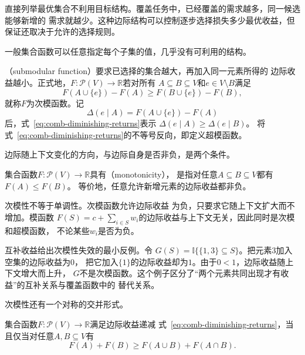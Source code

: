 直接列举最优集合不利用目标结构。覆盖任务中，已经覆盖的需求越多，同一候选能够新增的
需求就越少。这种边际结构可以控制逐步选择损失多少最优收益，但保证还取决于允许的选择规则。

一般集合函数可以任意指定每个子集的值，几乎没有可利用的结构。
\begin{definition}[次模函数与边际收益]
\label{def:comb-submodular-function}
（submodular function）要求已选择的集合越大，再加入同一元素所得的
边际收益越小。正式地，$F:\mathcal{P}(V)\to\mathbb{R}$若对所有
$A\subseteq B\subseteq V$和$e\in V\setminus B$满足
\begin{equation}
  F(A\cup\{e\})-F(A)
  \geq
  F(B\cup\{e\})-F(B),
  \label{eq:comb-diminishing-returns}
\end{equation}
就称$F$为次模函数。记
\[
  \Delta(e\mid A)=F(A\cup\{e\})-F(A)
\]
后，式~\eqref{eq:comb-diminishing-returns}表示
$\Delta(e\mid A)\geq\Delta(e\mid B)$。
将式~\eqref{eq:comb-diminishing-returns}的不等号反向，即定义超模函数。
\end{definition}

边际随上下文变化的方向，与边际自身是否非负，是两个条件。
\begin{definition}[集合函数的单调性]
\label{def:comb-monotone-set-function}
集合函数$F:\mathcal P(V)\to\mathbb R$具有（monotonicity），
是指对任意$A\subseteq B\subseteq V$都有$F(A)\leq F(B)$。
等价地，任意允许新增元素的边际收益都非负。
\end{definition}
次模性不等于单调性。次模函数允许边际收益
为负，只要求它随上下文扩大而不增加。模函数
$F(S)=c+\sum_{i\in S}w_i$的边际收益与上下文无关，因此同时是次模和超模函数，
不论某些$w_i$是否为负。

互补收益给出次模性失效的最小反例。令
$G(S)=\mathbb{I}\{\{1,3\}\subseteq S\}$。把元素$3$加入空集的边际收益为$0$，
把它加入$\{1\}$的边际收益却为$1$。由于$0<1$，边际收益随上下文增大而上升，
$G$不是次模函数。这个例子区分了“两个元素共同出现才有收益”的互补关系与覆盖函数中的
替代关系。

次模性还有一个对称的交并形式。

\begin{theorem}[次模性的两个等价定义]
\label{thm:comb-submodular-equivalence}
集合函数$F:\mathcal{P}(V)\to\mathbb{R}$满足边际收益递减
式~\eqref{eq:comb-diminishing-returns}，当且仅当对任意$A,B\subseteq V$有
\begin{equation}
  F(A)+F(B)\geq F(A\cup B)+F(A\cap B).
  \label{eq:comb-submodular-lattice}
\end{equation}
\end{theorem}

